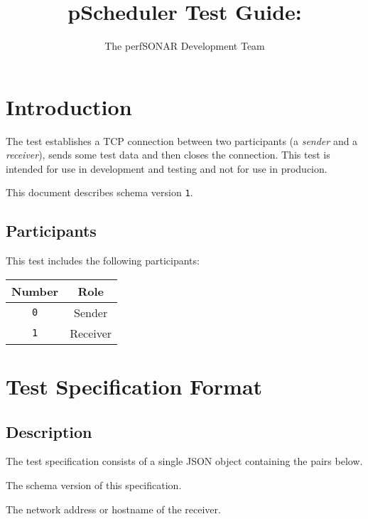 \documentclass[10pt]{article}
\title{pScheduler Test Guide: {\it \testname}}
\author{The perfSONAR Development Team}
\begin{document}
\maketitle


%
%

\section{Introduction}

The {\tt \testname} test establishes a TCP connection between two
participants (a {\it sender} and a {\it receiver}), sends some test
data and then closes the connection.  This test is intended for use in
development and testing and not for use in producion.

This document describes schema version {\tt 1}.

\subsection{Participants}

This test includes the following participants:

\begin{center}
\begin{tabular}{|c|c|}
\hline
{\bf Number} & {\bf Role} \\
\hline
{\tt 0} & Sender \\
{\tt 1} & Receiver \\
\hline
\end{tabular}
\end{center}



%
%

\section{Test Specification Format}

\subsection{Description}

The test specification consists of a single JSON object containing the
pairs below.  \seejson

 The schema version of this specification.

 The network address or hostname of the receiver.
\end{document}
